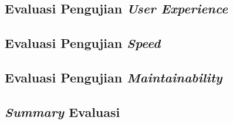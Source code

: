 	\subsection{Evaluasi Pengujian \textit{User Experience}}
	
	\subsection{Evaluasi Pengujian \textit{Speed}}
	
	\subsection{Evaluasi Pengujian \textit{Maintainability}}
	
	\subsection{\textit{Summary} Evaluasi}
	
	

	